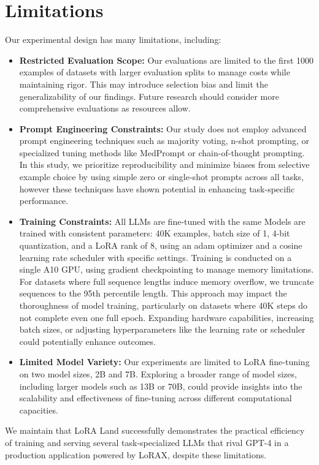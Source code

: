 \section{Limitations}
\label{sec:limitations}

Our experimental design has many limitations, including:

\begin{itemize}

\item \textbf{Restricted Evaluation Scope:} Our evaluations are limited to the first 1000 examples of datasets with larger evaluation splits to manage costs while maintaining rigor. This may introduce selection bias and limit the generalizability of our findings. Future research should consider more comprehensive evaluations as resources allow.

\item \textbf{Prompt Engineering Constraints:} Our study does not employ advanced prompt engineering techniques such as majority voting, n-shot prompting, or specialized tuning methods like MedPrompt or chain-of-thought prompting. In this study, we prioritize reproducibility and minimize biases from selective example choice by using simple zero or single-shot prompts across all tasks, however these techniques have shown potential in enhancing task-specific performance.

\item \textbf{Training Constraints:} All LLMs are fine-tuned with the same Models are trained with consistent parameters: 40K examples, batch size of 1, 4-bit quantization, and a LoRA rank of 8, using an adam optimizer and a cosine learning rate scheduler with specific settings. Training is conducted on a single A10 GPU, using gradient checkpointing to manage memory limitations. For datasets where full sequence lengths induce memory overflow, we truncate sequences to the 95th percentile length. This approach may impact the thoroughness of model training, particularly on datasets where 40K steps do not complete even one full epoch. Expanding hardware capabilities, increasing batch sizes, or adjusting hyperparameters like the learning rate or scheduler could potentially enhance outcomes.

\item \textbf{Limited Model Variety:} Our experiments are limited to LoRA fine-tuning on two model sizes, 2B and 7B. Exploring a broader range of model sizes, including larger models such as 13B or 70B, could provide insights into the scalability and effectiveness of fine-tuning across different computational capacities.

\end{itemize}

We maintain that LoRA Land successfully demonstrates the practical efficiency of training and serving several task-specialized LLMs that rival GPT-4 in a production application powered by LoRAX, despite these limitations.
